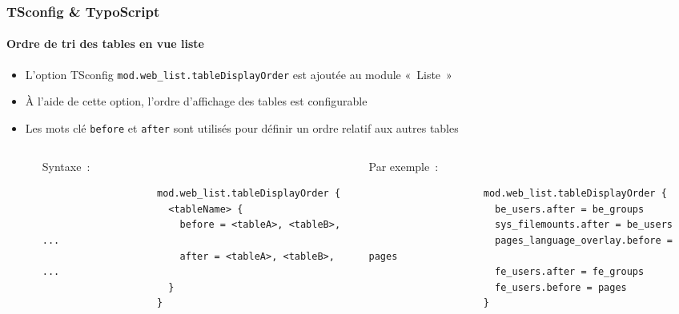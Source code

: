 \begin{frame}[fragile]
	\frametitle{TSconfig \& TypoScript}
	\framesubtitle{Ordre de tri des tables en vue liste}

	\lstset{basicstyle=\tiny\ttfamily}

	\begin{itemize}

		\item L'option TSconfig \texttt{mod.web\_list.tableDisplayOrder} est ajoutée au module «~Liste~»

		\item À l'aide de cette option, l'ordre d'affichage des tables est configurable

		\item Les mots clé \texttt{before} et \texttt{after} sont utilisés pour définir un ordre relatif aux autres tables

		\begin{columns}[T]
			\begin{column}{.07\textwidth}
			\end{column}
			\begin{column}{.465\textwidth}

				\small Syntaxe~:\normalsize

				\begin{lstlisting}
					mod.web_list.tableDisplayOrder {
					  <tableName> {
					    before = <tableA>, <tableB>, ...
					    after = <tableA>, <tableB>, ...
					  }
					}
				\end{lstlisting}
			\end{column}
			\begin{column}{.465\textwidth}

				\small Par exemple~:\normalsize

				\begin{lstlisting}
					mod.web_list.tableDisplayOrder {
					  be_users.after = be_groups
					  sys_filemounts.after = be_users
					  pages_language_overlay.before = pages
					  fe_users.after = fe_groups
					  fe_users.before = pages
					}
				\end{lstlisting}

			\end{column}
		\end{columns}

	\end{itemize}

\end{frame}


